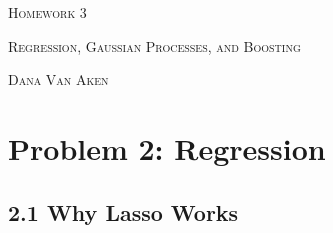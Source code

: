 \documentclass{article}
\begin{document}
\section*{}
\begin{center}
  \centerline{\textsc{\LARGE Homework 3}}
  \vspace{0.5em}
  \centerline{\textsc{Regression, Gaussian Processes, and Boosting}}
  \vspace{1em}
  \textsc{\large Dana Van Aken} \\
\end{center}

\section*{Problem 2: Regression}

\subsection*{2.1 Why Lasso Works}
\end{document}
